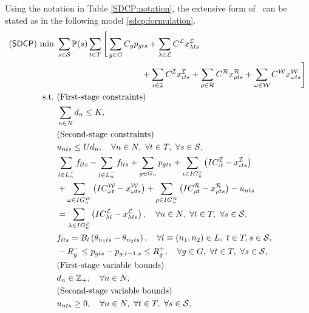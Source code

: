 Using the notation in Table \ref{SDCP:notation}, the extensive form of \sdcp\ can be stated as in the following model \ref{sdcp:formulation}.
\begin{subequations} \label{sdcp:formulation}
	\begin{align}
	(\sdcp)\ \textrm{min}\ &\sum_{s\in\mathcal{S}}\PP(s)\sum_{t\in T} 
	\Bigg[\sum_{g\in G}C_g p_{gts} + \sum_{\lambda\in \mathcal{L}} C^{\mathcal{L}}x_{\lambda ts}^{\mathcal{L}} \nonumber \\&\qquad\qquad\qquad\qquad\qquad + \sum_{\iota\in \mathcal{I}} C^{\mathcal{I}}x_{\iota ts}^{\mathcal{I}} + \sum_{\rho\in \mathcal{R}} C^{\mathcal{R}}x_{\rho ts}^{\mathcal{R}} + \sum_{\omega\in \mathcal{W}} C^{\mathcal{W}}x_{\omega ts}^{\mathcal{W}} \Bigg]
	\label{sdcp:obj}\\
	\textrm{s.t.}\ &  \textrm{(First-stage constraints)} \nonumber\\
	&\sum_{n\in N} d_n \le K,\label{sdcp:b}\\
	&\textrm{(Second-stage constraints)} \nonumber\\
	&u_{nts} \le Ud_n,\quad\forall n\in N,\ \forall t\in T,\ \forall s\in\mathcal{S},\label{sdcp:c}\\
	&\sum_{l\in L_n^+}f_{lts}-\sum_{l\in L_n^-}f_{lts}+\sum_{g\in G_n}p_{gts}+\sum_{\iota\in IG_n^\mathcal{I}}\left(IC_{\iota t}^\mathcal{I}-x_{\iota ts}^\mathcal{I}\right)\nonumber\\
	&+\sum_{\omega\in IG_n^\mathcal{W}}\left(IC_{\omega t}^\mathcal{W}-x_{\omega ts}^\mathcal{W}\right)
	+\sum_{\rho\in IG_n^\mathcal{R}}\left(IC_{\rho t}^\mathcal{R}-x_{\rho ts}^\mathcal{R}\right)
	-u_{nts} \nonumber\\
	&=\sum_{\lambda\in IG_n^\mathcal{L}}\left(IC_{\lambda t}^\mathcal{L}-x_{\lambda ts}^\mathcal{L}\right),\quad\forall n\in N,\ \forall t\in T,\ \forall s\in\mathcal{S},\label{sdcp:d}\\
	&f_{lts}=B_l\left(  \theta_{n_1 ts}-\theta_{n_2 ts}  \right),\quad\forall l\equiv (n_1, n_2)\in L,\ t\in T, s\in\mathcal{S},\label{sdcp:e}\\
	&-R_g^- \le p_{gts}-p_{g,t-1,s} \le R_g^+ ,\quad\forall g\in G,\ \forall t\in T,\ \forall s\in\mathcal{S},\label{sdcp:f}\\
	&  \textrm{(First-stage variable bounds)} \nonumber\\
	&d_n \in \mathbb{Z}_+,\quad \forall n\in N,\label{sdcp:g}\\
	&  \textrm{(Second-stage variable bounds)} \nonumber\\
	&u_{nts}\ge 0,\quad\forall n\in N,\ \forall t\in T,\ \forall s\in\mathcal{S},\label{sdcp:h}\\

\end{align}
\end{subequations}

